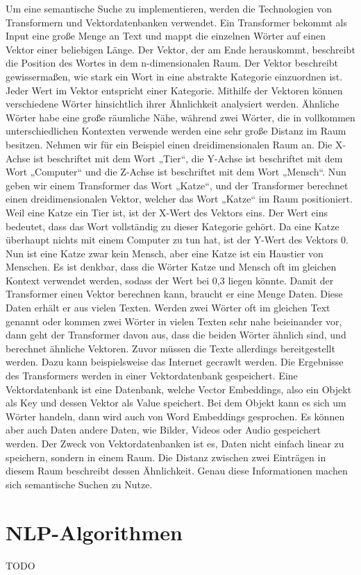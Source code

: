 Um eine semantische Suche zu implementieren, werden die Technologien von Transformern und Vektordatenbanken verwendet.
Ein Transformer bekommt als Input eine große Menge an Text und mappt die einzelnen Wörter auf einen Vektor einer beliebigen Länge.
Der Vektor, der am Ende herauskommt, beschreibt die Position des Wortes in dem n-dimensionalen Raum.
Der Vektor beschreibt gewissermaßen, wie stark ein Wort in eine abstrakte Kategorie einzuordnen ist.
Jeder Wert im Vektor entspricht einer Kategorie.
Mithilfe der Vektoren können verschiedene Wörter hinsichtlich ihrer Ähnlichkeit analysiert werden.
Ähnliche Wörter habe eine große räumliche Nähe, während zwei Wörter, die in vollkommen unterschiedlichen Kontexten verwende werden eine sehr große Distanz im Raum besitzen.
Nehmen wir für ein Beispiel einen dreidimensionalen Raum an.
Die X-Achse ist beschriftet mit dem Wort „Tier“, die Y-Achse ist beschriftet mit dem Wort „Computer“ und die Z-Achse ist beschriftet mit dem Wort „Mensch“.
Nun geben wir einem Transformer das Wort „Katze“, und der Transformer berechnet einen dreidimensionalen Vektor, welcher das Wort „Katze“ im Raum positioniert.
Weil eine Katze ein Tier ist, ist der X-Wert des Vektors eins.
 Der Wert eins bedeutet, dass das Wort vollständig zu dieser Kategorie gehört.
Da eine Katze überhaupt nichts mit einem Computer zu tun hat, ist der Y-Wert des Vektors 0.
Nun ist eine Katze zwar kein Mensch, aber eine Katze ist ein Haustier von Menschen.
Es ist denkbar, dass die Wörter Katze und Mensch oft im gleichen Kontext verwendet werden, sodass der Wert bei 0,3 liegen könnte.
Damit der Transformer einen Vektor berechnen kann, braucht er eine Menge Daten.
Diese Daten erhält er aus vielen Texten.
Werden zwei Wörter oft im gleichen Text genannt oder kommen zwei Wörter in vielen Texten sehr nahe beieinander vor, dann geht der Transformer davon aus, dass die beiden Wörter ähnlich sind, und berechnet ähnliche Vektoren.
Zuvor müssen die Texte allerdings bereitgestellt werden.
Dazu kann beispielsweise das Internet gecrawlt werden.
Die Ergebnisse des Transformers werden in einer Vektordatenbank gespeichert.
Eine Vektordatenbank ist eine Datenbank, welche Vector Embeddings, also ein Objekt als Key und dessen Vektor als Value speichert.
Bei dem Objekt kann es sich um Wörter handeln, dann wird auch von Word Embeddings gesprochen.
Es können aber auch Daten andere Daten, wie Bilder, Videos oder Audio gespeichert werden.
Der Zweck von Vektordatenbanken ist es, Daten nicht einfach linear zu speichern, sondern in einem Raum.
Die Distanz zwischen zwei Einträgen in diesem Raum beschreibt dessen Ähnlichkeit.
Genau diese Informationen machen sich semantische Suchen zu Nutze.

\section{NLP-Algorithmen}

TODO